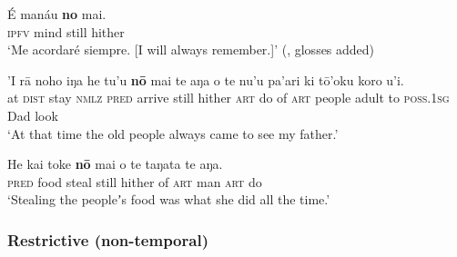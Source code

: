 \begin{exe}
		\ex\label{exAppendixRapaNuiAlways1}
		\gll É manáu \textbf{no} mai.\\
		\textsc{ipfv} mind still hither\\
		\glt \lq Me acordaré siempre. [I will always remember.]\rq{ }(\cite[103]{Fuentes1960}, glosses added)
	
		\ex\label{exAppendixRapaNuiAlways2}
		\gll 'I rā noho iŋa he tu'u \textbf{nō} mai te aŋa o te nu'u pa'ari ki tō'oku koro u'i.\\
		at \textsc{dist} stay \textsc{nmlz} \textsc{pred} arrive still hither \textsc{art} do of \textsc{art} people adult to \textsc{poss}.1\textsc{sg} Dad look\\
		\glt \lq At that time the old people always came to see my father.\rq{ }\parencite[91]{Kieviet2017}

		\ex\label{exAppendixRapaNuiAlways3}
		\gll He kai toke \textbf{nō} mai o te taŋata te aŋa.\\
		\textsc{pred} food steal still hither of \textsc{art} man \textsc{art} do\\
		\glt \lq Stealing the peopleʼs food was what she did all the time.\rq{ }\parencite[263]{Kieviet2017}
\end{exe}
\largerpage[2]
\subsubsection{Restrictive (non-temporal)}
